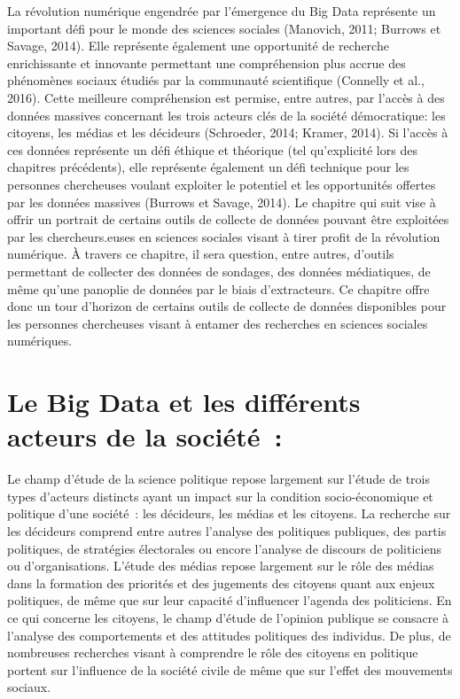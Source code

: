 \documentclass[
  letterpaper,
]{scrbook}
\begin{document}
La révolution numérique engendrée par l'émergence du Big Data représente
un important défi pour le monde des sciences sociales (Manovich, 2011;
Burrows et Savage, 2014). Elle représente également une opportunité de
recherche enrichissante et innovante permettant une compréhension plus
accrue des phénomènes sociaux étudiés par la communauté scientifique
(Connelly et al., 2016). Cette meilleure compréhension est permise,
entre autres, par l'accès à des données massives concernant les trois
acteurs clés de la société démocratique: les citoyens, les médias et les
décideurs (Schroeder, 2014; Kramer, 2014). Si l'accès à ces données
représente un défi éthique et théorique (tel qu'explicité lors des
chapitres précédents), elle représente également un défi technique pour
les personnes chercheuses voulant exploiter le potentiel et les
opportunités offertes par les données massives (Burrows et Savage,
2014). Le chapitre qui suit vise à offrir un portrait de certains outils
de collecte de données pouvant être exploitées par les chercheurs.euses
en sciences sociales visant à tirer profit de la révolution numérique. À
travers ce chapitre, il sera question, entre autres, d'outils permettant
de collecter des données de sondages, des données médiatiques, de même
qu'une panoplie de données par le biais d'extracteurs. Ce chapitre offre
donc un tour d'horizon de certains outils de collecte de données
disponibles pour les personnes chercheuses visant à entamer des
recherches en sciences sociales numériques.

\hypertarget{le-big-data-et-les-diffuxe9rents-acteurs-de-la-sociuxe9tuxe9}{%
\section{\texorpdfstring{\textbf{Le Big Data et les différents acteurs
de la
société~:}}{Le Big Data et les différents acteurs de la société~:}}\label{le-big-data-et-les-diffuxe9rents-acteurs-de-la-sociuxe9tuxe9}}

Le champ d'étude de la science politique repose largement sur l'étude de
trois types d'acteurs distincts ayant un impact sur la condition
socio-économique et politique d'une société~: les décideurs, les médias
et les citoyens. La recherche sur les décideurs comprend entre autres
l'analyse des politiques publiques, des partis politiques, de stratégies
électorales ou encore l'analyse de discours de politiciens ou
d'organisations. L'étude des médias repose largement sur le rôle des
médias dans la formation des priorités et des jugements des citoyens
quant aux enjeux politiques, de même que sur leur capacité d'influencer
l'agenda des politiciens. En ce qui concerne les citoyens, le champ
d'étude de l'opinion publique se consacre à l'analyse des comportements
et des attitudes politiques des individus. De plus, de nombreuses
recherches visant à comprendre le rôle des citoyens en politique portent
sur l'influence de la société civile de même que sur l'effet des
mouvements sociaux.
\end{document}
